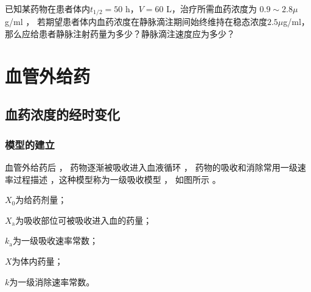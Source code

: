 \documentclass[dvipsnames, svgnames, x11names]{beamer}
\begin{document}
\begin{frame}[t]
    \frametitle{}
\begin{question}
    已知某药物在患者体内$t_{1/2}= 50$ h，$V=60$ L，治疗所需血药浓度为 $0.9\sim 2.8 \mu$g/ml ， 若期望患者体内血药浓度在静脉滴注期间始终维持在稳态浓度$2.5 \mu$g/ml，那么应给患者静脉注射药量为多少？静脉滴注速度应为多少？
\end{question}
\end{frame}


\section{血管外给药}


\subsection{血药浓度的经时变化}


\begin{frame}
    \frametitle{模型的建立}
    血管外给药后 ， 药物逐渐被吸收进入血液循环 ， 药物的吸收和消除常用一级速率过程描述 ，这种模型称为一级吸收模型 ， 如图所示 。
    \begin{center}
    \end{center}
    $X_0$为给药剂量；

    $X_\mathrm{a}$为吸收部位可被吸收进入血的药量；

    $k_\mathrm{a}$为一级吸收速率常数；
    
    $X$为体内药量；
    
    $k$为一级消除速率常数。
\end{frame}
\end{document}
